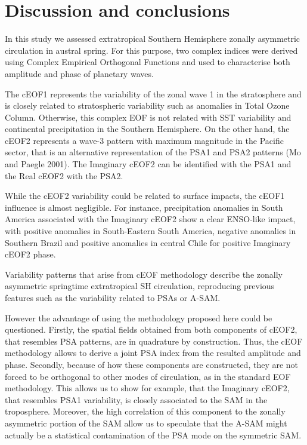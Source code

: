 \documentclass[smallextended]{svjour3}       %
\begin{document}
\hypertarget{discussion}{%
\section{Discussion and conclusions}\label{discussion}}

In this study we assessed extratropical Southern Hemisphere zonally asymmetric circulation in austral spring. For this purpose, two complex indices were derived using Complex Empirical Orthogonal Functions and used to characterise both amplitude and phase of planetary waves.

The cEOF1 represents the variability of the zonal wave 1 in the stratosphere and is closely related to stratospheric variability such as anomalies in Total Ozone Column. Otherwise, this complex EOF is not related with SST variability and continental precipitation in the Southern Hemisphere. On the other hand, the cEOF2 represents a wave-3 pattern with maximum magnitude in the Pacific sector, that is an alternative representation of the PSA1 and PSA2 patterns (Mo and Paegle 2001). The Imaginary cEOF2 can be identified with the PSA1 and the Real cEOF2 with the PSA2.

While the cEOF2 variability could be related to surface impacts, the cEOF1 influence is almost negligible. For instance, precipitation anomalies in South America associated with the Imaginary cEOF2 show a clear ENSO-like impact, with positive anomalies in South-Eastern South America, negative anomalies in Southern Brazil and positive anomalies in central Chile for positive Imaginary cEOF2 phase.

Variability patterns that arise from cEOF methodology describe the zonally asymmetric springtime extratropical SH circulation, reproducing previous features such as the variability related to PSAs or A-SAM.

However the advantage of using the methodology proposed here could be questioned.
Firstly, the spatial fields obtained from both components of cEOF2, that resembles PSA patterns, are in quadrature by construction.
Thus, the cEOF methodology allows to derive a joint PSA index from the resulted amplitude and phase.
Secondly, because of how these components are constructed, they are not forced to be orthogonal to other modes of circulation, as in the standard EOF methodology.
This allows us to show for example, that the Imaginary cEOF2, that resembles PSA1 variability, is closely associated to the SAM in the troposphere.
Moreover, the high correlation of this component to the zonally asymmetric portion of the SAM allow us to speculate that the A-SAM might actually be a statistical contamination of the PSA mode on the symmetric SAM.
\end{document}
